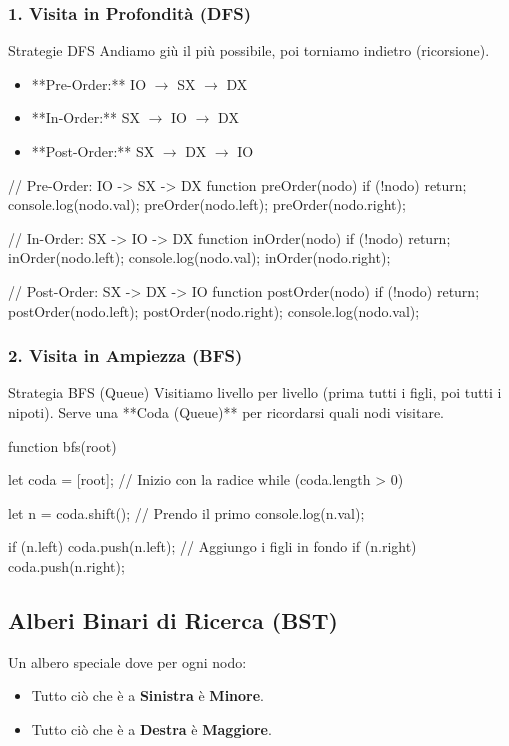 \subsubsection{1. Visita in Profondità (DFS)}
\begin{concept}{Strategie DFS}
Andiamo giù il più possibile, poi torniamo indietro (ricorsione).
\begin{itemize}
    \item **Pre-Order:** IO $\to$ SX $\to$ DX
    \item **In-Order:** SX $\to$ IO $\to$ DX
    \item **Post-Order:** SX $\to$ DX $\to$ IO
\end{itemize}
\end{concept}

\begin{jsbox}
// Pre-Order: IO -> SX -> DX
function preOrder(nodo) {
    if (!nodo) return;
    console.log(nodo.val);
    preOrder(nodo.left);
    preOrder(nodo.right);
}

// In-Order: SX -> IO -> DX
function inOrder(nodo) {
    if (!nodo) return;
    inOrder(nodo.left);
    console.log(nodo.val);
    inOrder(nodo.right);
}

// Post-Order: SX -> DX -> IO
function postOrder(nodo) {
    if (!nodo) return;
    postOrder(nodo.left);
    postOrder(nodo.right);
    console.log(nodo.val);
}
\end{jsbox}

\subsubsection{2. Visita in Ampiezza (BFS)}
\begin{concept}{Strategia BFS (Queue)}
Visitiamo livello per livello (prima tutti i figli, poi tutti i nipoti).
Serve una **Coda (Queue)** per ricordarsi quali nodi visitare.
\end{concept}

\begin{jsbox}
function bfs(root) {
    let coda = [root]; // Inizio con la radice
    while (coda.length > 0) {
        let n = coda.shift(); // Prendo il primo
        console.log(n.val);
        
        if (n.left) coda.push(n.left);   // Aggiungo i figli in fondo
        if (n.right) coda.push(n.right);
    }
}
\end{jsbox}

\subsection{Alberi Binari di Ricerca (BST)}
Un albero speciale dove per ogni nodo:
\begin{itemize}
    \item Tutto ciò che è a \textbf{Sinistra} è \textbf{Minore}.
    \item Tutto ciò che è a \textbf{Destra} è \textbf{Maggiore}.
\end{itemize}

